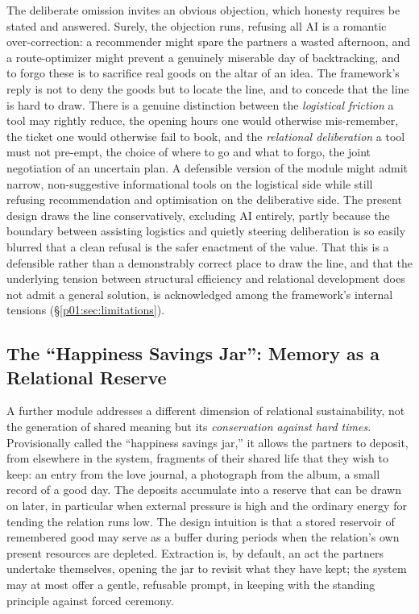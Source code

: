 The deliberate omission invites an obvious objection, which honesty requires be stated and answered. Surely, the objection runs, refusing all AI is a romantic over-correction: a recommender might spare the partners a wasted afternoon, and a route-optimizer might prevent a genuinely miserable day of backtracking, and to forgo these is to sacrifice real goods on the altar of an idea. The framework's reply is not to deny the goods but to locate the line, and to concede that the line is hard to draw. There is a genuine distinction between the \emph{logistical friction} a tool may rightly reduce, the opening hours one would otherwise mis-remember, the ticket one would otherwise fail to book, and the \emph{relational deliberation} a tool must not pre-empt, the choice of where to go and what to forgo, the joint negotiation of an uncertain plan. A defensible version of the module might admit narrow, non-suggestive informational tools on the logistical side while still refusing recommendation and optimisation on the deliberative side. The present design draws the line conservatively, excluding AI entirely, partly because the boundary between assisting logistics and quietly steering deliberation is so easily blurred that a clean refusal is the safer enactment of the value. That this is a defensible rather than a demonstrably correct place to draw the line, and that the underlying tension between structural efficiency and relational development does not admit a general solution, is acknowledged among the framework's internal tensions (§\ref{p01:sec:limitations}).

\subsection{The ``Happiness Savings Jar'': Memory as a Relational Reserve}\label{p01:sec:savingsjar}

A further module addresses a different dimension of relational sustainability, not the generation of shared meaning but its \emph{conservation against hard times}. Provisionally called the ``happiness savings jar,'' it allows the partners to deposit, from elsewhere in the system, fragments of their shared life that they wish to keep: an entry from the love journal, a photograph from the album, a small record of a good day. The deposits accumulate into a reserve that can be drawn on later, in particular when external pressure is high and the ordinary energy for tending the relation runs low. The design intuition is that a stored reservoir of remembered good may serve as a buffer during periods when the relation's own present resources are depleted. Extraction is, by default, an act the partners undertake themselves, opening the jar to revisit what they have kept; the system may at most offer a gentle, refusable prompt, in keeping with the standing principle against forced ceremony.

